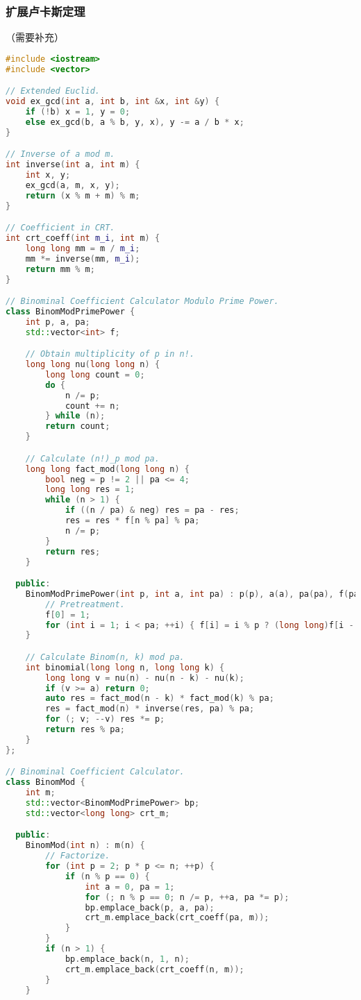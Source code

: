 \documentclass[9pt, a4paper, oneside]{book}
\begin{document}
\subsubsection{扩展卢卡斯定理}
（需要补充）
\begin{lstlisting}[language={C++}]
#include <iostream>
#include <vector>

// Extended Euclid.
void ex_gcd(int a, int b, int &x, int &y) {
    if (!b) x = 1, y = 0;
    else ex_gcd(b, a % b, y, x), y -= a / b * x;
}

// Inverse of a mod m.
int inverse(int a, int m) {
    int x, y;
    ex_gcd(a, m, x, y);
    return (x % m + m) % m;
}

// Coefficient in CRT.
int crt_coeff(int m_i, int m) {
    long long mm = m / m_i;
    mm *= inverse(mm, m_i);
    return mm % m;
}

// Binominal Coefficient Calculator Modulo Prime Power.
class BinomModPrimePower {
    int p, a, pa;
    std::vector<int> f;

    // Obtain multiplicity of p in n!.
    long long nu(long long n) {
        long long count = 0;
        do {
            n /= p;
            count += n;
        } while (n);
        return count;
    }

    // Calculate (n!)_p mod pa.
    long long fact_mod(long long n) {
        bool neg = p != 2 || pa <= 4;
        long long res = 1;
        while (n > 1) {
            if ((n / pa) & neg) res = pa - res;
            res = res * f[n % pa] % pa;
            n /= p;
        }
        return res;
    }

  public:
    BinomModPrimePower(int p, int a, int pa) : p(p), a(a), pa(pa), f(pa) {
        // Pretreatment.
        f[0] = 1;
        for (int i = 1; i < pa; ++i) { f[i] = i % p ? (long long)f[i - 1] * i % pa : f[i - 1]; }
    }

    // Calculate Binom(n, k) mod pa.
    int binomial(long long n, long long k) {
        long long v = nu(n) - nu(n - k) - nu(k);
        if (v >= a) return 0;
        auto res = fact_mod(n - k) * fact_mod(k) % pa;
        res = fact_mod(n) * inverse(res, pa) % pa;
        for (; v; --v) res *= p;
        return res % pa;
    }
};

// Binominal Coefficient Calculator.
class BinomMod {
    int m;
    std::vector<BinomModPrimePower> bp;
    std::vector<long long> crt_m;

  public:
    BinomMod(int n) : m(n) {
        // Factorize.
        for (int p = 2; p * p <= n; ++p) {
            if (n % p == 0) {
                int a = 0, pa = 1;
                for (; n % p == 0; n /= p, ++a, pa *= p);
                bp.emplace_back(p, a, pa);
                crt_m.emplace_back(crt_coeff(pa, m));
            }
        }
        if (n > 1) {
            bp.emplace_back(n, 1, n);
            crt_m.emplace_back(crt_coeff(n, m));
        }
    }


\end{lstlisting}
\end{document}
